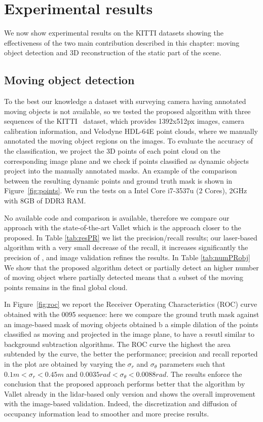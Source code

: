 \section{Experimental results}%
\label{sec:experiments}
We now show experimental results on the KITTI datasets showing the effectiveness of the two main contribution described in this chapter: moving object detection and 3D reconstruction of the static part of the scene.
\subsection{Moving object detection}
To the best our knowledge a dataset with surveying camera having annotated moving objects is not available, so we tested the proposed algorithm with three sequences of the KITTI~\cite{Kitti} dataset, which provides 1392x512px images, camera calibration information, and Velodyne HDL-64E point clouds, where we manually annotated the moving object regions on the images. To evaluate the accuracy of the classification, we project the 3D points of each point cloud on the corresponding image plane and we check if points classified as dynamic objects project into the manually annotated masks. An example of the comparison between the resulting dynamic points and ground truth mask is shown in Figure~\ref{fig:points}.
We run the tests on a  Intel Core i7-3537u (2 Cores), 2GHz with 8GB of DDR3 RAM. 

No available code and comparison is available, therefore we compare our approach with the state-of-the-art Vallet \etal \cite{vallet2015extracting} which is the approach closer to the proposed.
In Table \ref{tab:resPR} we list the precision/recall results; our laser-based algorithm with a very small decrease of the recall, it increases significantly the precision of \cite{vallet2015extracting}, and image validation refines the results.
In Table \ref{tab:numPRobj} We show that the proposed algorithm detect or partially detect an higher number of moving object where  partially detected means that a subset of the moving points remains in the final global cloud.

In Figure~\ref{fig:roc} we report the Receiver Operating Characteristics (ROC) curve obtained with the 0095 sequence: here we compare the ground truth mask against an image-based mask of moving objects obtained b a simple dilation of the points classified as moving and projected in the image plane, to have a resutl similar to background subtraction algorithms. 
The ROC curve the highest the area subtended by the curve, the better the performance; precision and recall reported in the plot are obtained by varying the $\sigma_r$ and $\sigma_{\theta}$ parameters such that $0.1m<\sigma_r<0.45m$ and $0.0035rad<\sigma_{\theta}<0.0088rad$.
The results enforce the conclusion that the proposed approach performs better that the algorithm by Vallet \etal already in the lidar-based only version and shows the overall improvement with the image-based validation. Indeed, the discretization and diffusion of occupancy information lead to smoother and more precise results.

